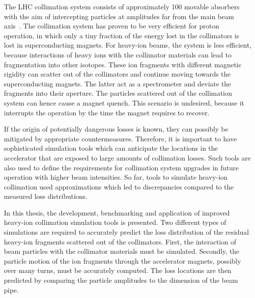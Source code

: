 The LHC collimation system consists of approximately 100 movable absorbers with the aim of intercepting particles at amplitudes far from the main beam axis~\cite{CERN-2004-003-V1,collimationsystemref1}. The collimation system has proven to be very efficient for proton operation, in which only a tiny fraction of the energy lost in the collimators is lost in superconducting magnets. For heavy-ion beams, the system is less efficient, because interactions of heavy ions with the collimator materials can lead to fragmentation into other isotopes. These ion fragments with different magnetic rigidity can scatter out of the collimators and continue moving towards the superconducting magnets. The latter act as a spectrometer and deviate the fragments into their aperture. The particles scattered out of the collimation system can hence cause a magnet quench. This scenario is undesired, because it interrupts the operation by the time the magnet requires to recover.
\vspace{0.2cm}

If the origin of potentially dangerous losses is known, they can possibly be mitigated by appropriate countermeasures. Therefore, it is important to have sophisticated simulation tools which can anticipate the locations in the accelerator that are exposed to large amounts of collimation losses. Such tools  are also used to define the requirements for collimation system upgrades in future operation with higher beam intensities. So far, tools to simulate heavy-ion collimation used approximations which led to discrepancies compared to the measured loss distributions.


\vspace{0.2cm}

In this thesis, the development, benchmarking and application of improved heavy-ion collimation simulation tools is presented. Two different types of simulations are required to accurately predict the loss distribution of the residual heavy-ion fragments scattered out of the collimators. First, the interaction of beam particles with the collimator materials must be simulated. Secondly, the particle motion of the ion fragments through the accelerator magnets, possibly over many turns, must be accurately computed. The loss locations are then predicted by comparing the particle amplitudes to the dimension of the beam pipe.
\vspace{0.2cm}

